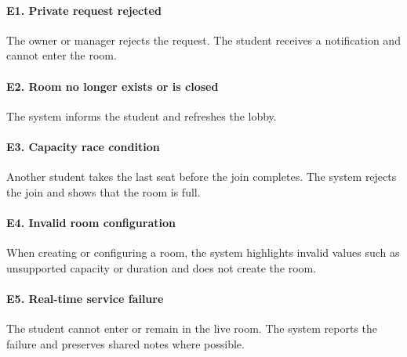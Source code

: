 \documentclass[12pt]{article}
\begin{document}
\hypertarget{sec:e1-private-request-rejected}{}
\paragraph*{E1. Private request rejected}
\par\medskip

The owner or manager rejects the request. The student receives a notification and cannot enter the room.
\par\medskip

\hypertarget{sec:e2-room-no-longer-exists-or-is-closed}{}
\paragraph*{E2. Room no longer exists or is closed}
\par\medskip

The system informs the student and refreshes the lobby.
\par\medskip

\hypertarget{sec:e3-capacity-race-condition}{}
\paragraph*{E3. Capacity race condition}
\par\medskip

Another student takes the last seat before the join completes. The system rejects the join and shows that the room is full.
\par\medskip

\hypertarget{sec:e4-invalid-room-configuration}{}
\paragraph*{E4. Invalid room configuration}
\par\medskip

When creating or configuring a room, the system highlights invalid values such as unsupported capacity or duration and does not create the room.
\par\medskip

\hypertarget{sec:e5-real-time-service-failure}{}
\paragraph*{E5. Real-time service failure}
\par\medskip

The student cannot enter or remain in the live room. The system reports the failure and preserves shared notes where possible.
\par\medskip
\end{document}
